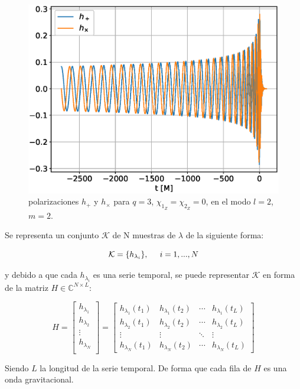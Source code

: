 \begin{figure}[h]
\centering
\includegraphics[width=.9\columnwidth]{figs/h_l2m2_q3.eps}
\caption{polarizaciones \(h_+\) y \(h_{\times}\) para $q = 3$, $\chi_{1_Z} = \chi_{2_Z} = 0$, en el modo $l=2$, $m=2$.}
\label{fig:h_q3}
\end{figure}



Se representa un conjunto \( \mathcal{K} \) de N muestras de $\lambda$ de la siguiente forma:

\[ \mathcal{K}  = \{h_{\lambda_i}\}, \hspace{5mm} i = 1, ..., N\]

y debido a que cada $h_{\lambda_i}$ es una serie temporal, se puede representar $\mathcal{K}$ en forma de la matriz $H \in \mathbb{C}^{N\times L}$:

\[
H = 
\begin{bmatrix}
h_{\lambda_1} \\
h_{\lambda_2} \\
 \vdots \\
 h_{\lambda_N} \\
\end{bmatrix}
= 
\begin{bmatrix}
h_{\lambda_1}(t_1) & h_{\lambda_1}(t_2)  & \cdots & h_{\lambda_1}(t_L)\\
 h_{\lambda_2}(t_1) & h_{\lambda_2}(t_2)  & \cdots & h_{\lambda_2}(t_L)\\
 \vdots & \vdots & \ddots &  \vdots \\
h_{\lambda_N}(t_1) & h_{\lambda_N}(t_2)  & \cdots & h_{\lambda_N}(t_L)
\end{bmatrix}
\]

Siendo $L$ la longitud de la serie temporal. De forma que cada fila de $H$ es una onda gravitacional.

